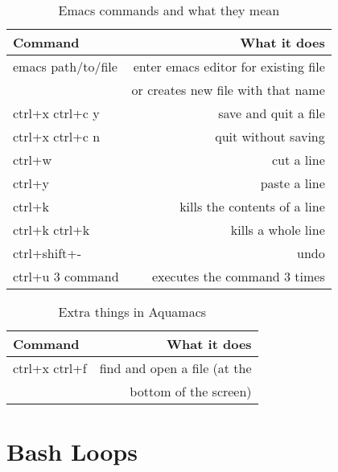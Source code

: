 \documentclass{article}
\begin{document}
\begin{table}
        \begin{center}
                \caption{Emacs commands and what they mean}
                \label{emacsChart}
                \begin{tabular}{l|r}
                  \textbf{Command} & \textbf{What it does}\\
                  \hline
                  emacs path/to/file & enter emacs editor for
                                             existing file \\
                   & or creates new file with that name \\
                  ctrl+x ctrl+c y & save and quit a file \\
                  ctrl+x ctrl+c n & quit without saving \\
                  ctrl+w & cut a line \\
                  ctrl+y & paste a line \\
                  ctrl+k & kills the contents of a line \\
                  ctrl+k ctrl+k & kills a whole line \\
                  ctrl+shift+- & undo \\
                  ctrl+u 3 command & executes the command 3 times \\
                 \end{tabular}
        \end{center}
\end{table}

\begin{table}
        \begin{center}
                \caption{Extra things in Aquamacs}
                \label{AquamacsChart}
                \begin{tabular}{l|r}
                  \textbf{Command} & \textbf{What it does}\\
                  \hline
                  ctrl+x ctrl+f & find and open a file (at the \\
                   & bottom of the screen) \\
                 \end{tabular}
        \end{center}
\end{table}

\section{Bash Loops}
\end{document}
